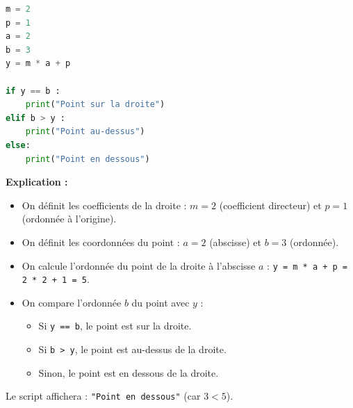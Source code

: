 \begin{enumerate}
\begin{lstlisting}[language=Python]
m = 2
p = 1
a = 2
b = 3
y = m * a + p

if y == b :
    print("Point sur la droite")
elif b > y :
    print("Point au-dessus")
else:
    print("Point en dessous")
\end{lstlisting}

			      \textbf{Explication :}
			      \begin{itemize}
				      \item On définit les coefficients de la droite : $m = 2$ (coefficient directeur) et $p = 1$ (ordonnée à l'origine).
				      \item On définit les coordonnées du point : $a = 2$ (abscisse) et $b = 3$ (ordonnée).
				      \item On calcule l'ordonnée du point de la droite à l'abscisse $a$ : \texttt{y = m * a + p = 2 * 2 + 1 = 5}.
				      \item On compare l'ordonnée $b$ du point avec $y$ :
				            \begin{itemize}
					            \item Si \texttt{y == b}, le point est sur la droite.
					            \item Si \texttt{b > y}, le point est au-dessus de la droite.
					            \item Sinon, le point est en dessous de la droite.
				            \end{itemize}
			      \end{itemize}

			      Le script affichera : \texttt{"Point en dessous"} (car $3 < 5$).
		\end{enumerate}
